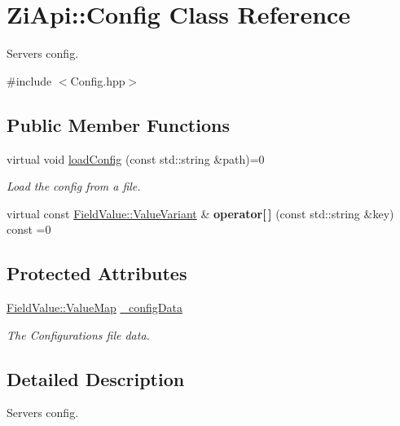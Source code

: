 \hypertarget{classZiApi_1_1Config}{}\section{Zi\+Api\+::Config Class Reference}
\label{classZiApi_1_1Config}


Server\textquotesingle{}s config.  




{\ttfamily \#include $<$Config.\+hpp$>$}

\subsection*{Public Member Functions}
\begin{DoxyCompactItemize}
\item 
virtual void \mbox{\hyperlink{classZiApi_1_1Config_adea7c918bc9802e935a76bc525d5c898}{load\+Config}} (const std\+::string \&path)=0
\begin{DoxyCompactList}\small\item\em Load the config from a file. \end{DoxyCompactList}\item 
\mbox{\label{classZiApi_1_1Config_a35e95b2fbf4adc334eb0b9df0966eda6}} 
virtual const \mbox{\hyperlink{classZiApi_1_1FieldValue_aa05c96baba965d0ad1cd54c7878f4450}{Field\+Value\+::\+Value\+Variant}} \& {\bfseries operator\mbox{[}$\,$\mbox{]}} (const std\+::string \&key) const =0
\end{DoxyCompactItemize}
\subsection*{Protected Attributes}
\begin{DoxyCompactItemize}
\item 
\mbox{\hyperlink{classZiApi_1_1FieldValue_ad8dd32464e75289185e2d8260cb3672d}{Field\+Value\+::\+Value\+Map}} \mbox{\hyperlink{classZiApi_1_1Config_abd7591f92a4590b36e93e0a5ada2373c}{\+\_\+config\+Data}}
\begin{DoxyCompactList}\small\item\em The Configuration\textquotesingle{}s file data. \end{DoxyCompactList}\end{DoxyCompactItemize}


\subsection{Detailed Description}
Server\textquotesingle{}s config. 

